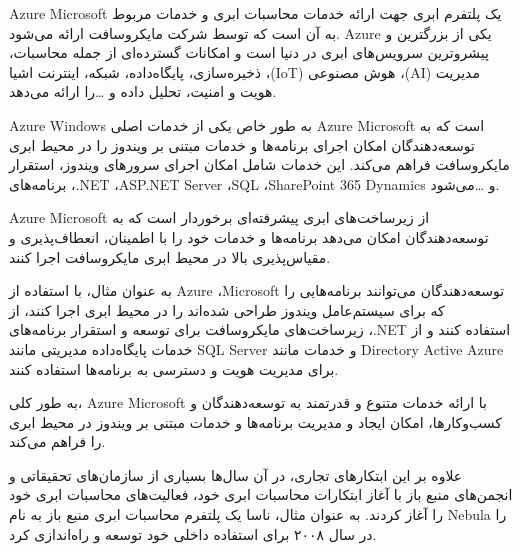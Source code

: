 \documentclass{book}
\begin{document}
            \begin{addinfo2}
                
                Azure Microsoft یک پلتفرم ابری جهت ارائه خدمات محاسبات ابری و خدمات مربوط به آن است که توسط شرکت مایکروسافت ارائه می‌شود. Azure یکی از بزرگترین و پیشروترین سرویس‌های ابری در دنیا است و امکانات گسترده‌ای از جمله محاسبات، ذخیره‌سازی، پایگاه‌داده، شبکه، اینترنت اشیا ،(IoT) هوش مصنوعی ،(AI) مدیریت هویت و امنیت، تحلیل داده و \dots را ارائه می‌دهد.

                Azure Windows به طور خاص یکی از خدمات اصلی Azure Microsoft است که به توسعه‌دهندگان امکان اجرای برنامه‌ها و خدمات مبتنی بر ویندوز را در محیط ابری مایکروسافت فراهم می‌کند. این خدمات شامل امکان اجرای سرورهای ویندوز، استقرار برنامه‌های ،.NET ،ASP.NET Server ،SQL ،SharePoint 365 Dynamics و \dots می‌شود.

                Azure Microsoft از زیرساخت‌های ابری پیشرفته‌ای برخوردار است که به توسعه‌دهندگان امکان می‌دهد برنامه‌ها و خدمات خود را با اطمینان، انعطاف‌پذیری و مقیاس‌پذیری بالا در محیط ابری مایکروسافت اجرا کنند.

                به عنوان مثال، با استفاده از Azure ،Microsoft توسعه‌دهندگان می‌توانند برنامه‌هایی را که برای سیستم‌عامل ویندوز طراحی شده‌اند را در محیط ابری اجرا کنند، از زیرساخت‌های مایکروسافت برای توسعه و استقرار برنامه‌های ،.NET استفاده کنند و از خدمات پایگاه‌داده مدیریتی مانند SQL Server و خدمات مانند Directory Active Azure برای مدیریت هویت و دسترسی به برنامه‌ها استفاده کنند.
                
                به طور کلی، Azure Microsoft با ارائه خدمات متنوع و قدرتمند به توسعه‌دهندگان و کسب‌وکارها، امکان ایجاد و مدیریت برنامه‌ها و خدمات مبتنی بر ویندوز در محیط ابری را فراهم می‌کند.

            \end{addinfo2}

            علاوه بر این ابتکارهای تجاری، در آن سال‌ها بسیاری از سازمان‌های تحقیقاتی و انجمن‌های منبع باز با آغاز ابتکارات محاسبات ابری خود، فعالیت‌های محاسبات ابری خود را آغاز کردند. به عنوان مثال، ناسا یک پلتفرم محاسبات ابری منبع باز به نام Nebula را در سال ۲۰۰۸ برای استفاده داخلی خود توسعه و راه‌اندازی کرد.
\end{document}
